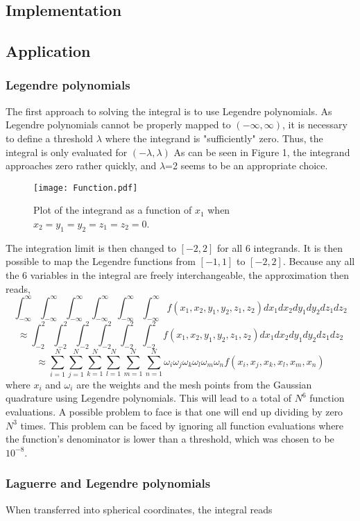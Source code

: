 \documentclass[10pt,a4paper]{article}
\begin{document}
\subsection{Implementation}
\subsection{Application}
\subsubsection{Legendre polynomials}
The first approach to solving the integral is to use Legendre polynomials. As Legendre polynomials cannot be properly mapped to $(-\infty,\infty)$, it is necessary to define a threshold $\lambda$ where the integrand is "sufficiently" zero. Thus, the integral is only evaluated for $(-\lambda,\lambda)$ As can be seen in Figure 1, the integrand approaches zero rather quickly, and $\lambda$=2 seems to be an appropriate choice.
\begin{figure}[H]
\centering
\texttt{[image: Function.pdf]}
\caption[Plot of function]{Plot of the integrand as a function of $x_1$ when $x_2=y_1=y_2=z_1=z_2=0$.}
\end{figure}
The integration limit is then changed to $[-2,2]$ for all 6 integrands. It is then possible to map the Legendre functions from $[-1,1]$ to $[-2,2]$. Because any all the 6 variables in the integral are freely interchangeable, the approximation then reads,
$$\int_{-\infty}^{\infty}\int_{-\infty}^{\infty}\int_{-\infty}^{\infty}\int_{-\infty}^{\infty}\int_{-\infty}^{\infty}\int_{-\infty}^{\infty}f(x_1,x_2,y_1,y_2,z_1,z_2)dx_1dx_2dy_1dy_2dz_1dz_2$$
$$\approx\int_{-2}^{2}\int_{-2}^{2}\int_{-2}^{2}\int_{-2}^{2}\int_{-2}^{2}\int_{-2}^{2}f(x_1,x_2,y_1,y_2,z_1,z_2)dx_1dx_2dy_1dy_2dz_1dz_2 $$
$$\approx\sum_{i=1}^{N}\sum_{j=1}^{N}\sum_{k=1}^{N}\sum_{l=1}^{N}\sum_{m=1}^{N}\sum_{n=1}^{N}\omega_i\omega_j\omega_k\omega_l\omega_m\omega_nf(x_i,x_j,x_k,x_l,x_m,x_n)$$
where $x_i$ and $\omega_i$ are the weights and the mesh points from the Gaussian quadrature using Legendre polynomials.
This will lead to a total of $N^6$ function evaluations. A possible problem to face is that one will end up dividing by zero $N^3$ times. This problem can be faced by ignoring all function evaluations where the function's denominator is lower than a threshold, which was chosen to be $10^{-8}$.
\subsubsection{Laguerre and Legendre polynomials}
When transferred into spherical coordinates, the integral reads
\end{document}
